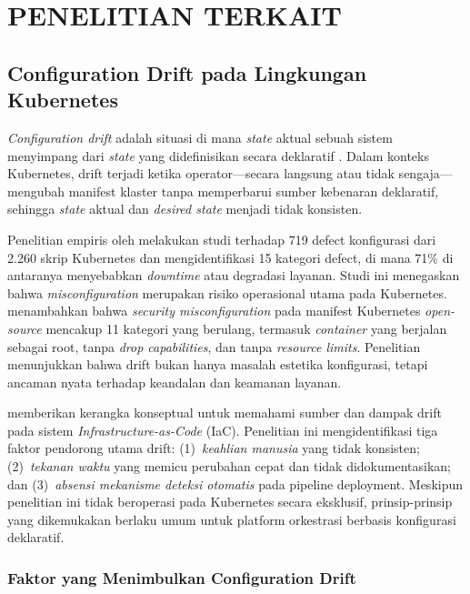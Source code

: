 \chapter{PENELITIAN TERKAIT}

\section{Configuration Drift pada Lingkungan Kubernetes}

\textit{Configuration drift} adalah situasi di mana \textit{state} aktual sebuah sistem menyimpang dari \textit{state} yang didefinisikan secara deklaratif \citep{pohjola2025mitigating}. Dalam konteks Kubernetes, drift terjadi ketika operator---secara langsung atau tidak sengaja---mengubah manifest klaster tanpa memperbarui sumber kebenaran deklaratif, sehingga \textit{state} aktual dan \textit{desired state} menjadi tidak konsisten.

Penelitian empiris oleh \citet{zhang2026configuration} melakukan studi terhadap 719 defect konfigurasi dari 2.260 skrip Kubernetes dan mengidentifikasi 15 kategori defect, di mana 71\% di antaranya menyebabkan \textit{downtime} atau degradasi layanan. Studi ini menegaskan bahwa \textit{misconfiguration} merupakan risiko operasional utama pada Kubernetes. \citet{rahman2023security} menambahkan bahwa \textit{security misconfiguration} pada manifest Kubernetes \textit{open-source} mencakup 11 kategori yang berulang, termasuk \textit{container} yang berjalan sebagai root, tanpa \textit{drop capabilities}, dan tanpa \textit{resource limits}. Penelitian menunjukkan bahwa drift bukan hanya masalah estetika konfigurasi, tetapi ancaman nyata terhadap keandalan dan keamanan layanan.

\citet{pohjola2025mitigating} memberikan kerangka konseptual untuk memahami sumber dan dampak drift pada sistem \textit{Infrastructure-as-Code} (IaC). Penelitian ini mengidentifikasi tiga faktor pendorong utama drift: (1)~\textit{keahlian manusia} yang tidak konsisten; (2)~\textit{tekanan waktu} yang memicu perubahan cepat dan tidak didokumentasikan; dan (3)~\textit{absensi mekanisme deteksi otomatis} pada pipeline deployment. Meskipun penelitian ini tidak beroperasi pada Kubernetes secara eksklusif, prinsip-prinsip yang dikemukakan berlaku umum untuk platform orkestrasi berbasis konfigurasi deklaratif.

\subsection{Faktor yang Menimbulkan Configuration Drift}

